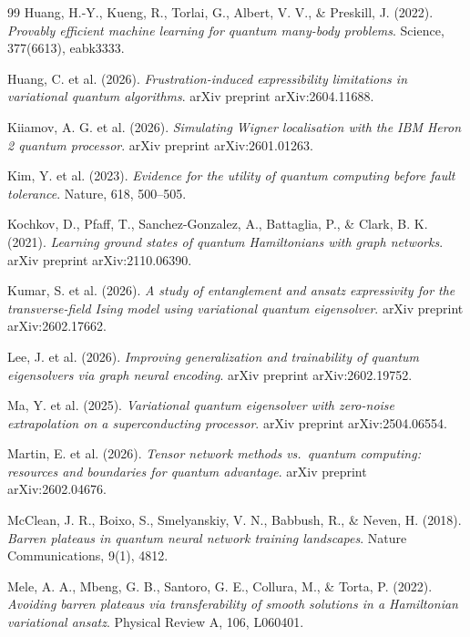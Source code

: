 \documentclass[11pt,a4paper,spanish]{book}
\begin{document}
\begin{thebibliography}{99}
 Huang, H.-Y., Kueng, R., Torlai, G., Albert, V. V., \& Preskill, J. (2022). \emph{Provably efficient machine learning for quantum many-body problems}. Science, 377(6613), eabk3333.

 Huang, C. et al. (2026). \emph{Frustration-induced expressibility limitations in variational quantum algorithms}. arXiv preprint arXiv:2604.11688.

 Kiiamov, A. G. et al. (2026). \emph{Simulating Wigner localisation with the IBM Heron 2 quantum processor}. arXiv preprint arXiv:2601.01263.

 Kim, Y. et al. (2023). \emph{Evidence for the utility of quantum computing before fault tolerance}. Nature, 618, 500--505.

 Kochkov, D., Pfaff, T., Sanchez-Gonzalez, A., Battaglia, P., \& Clark, B. K. (2021). \emph{Learning ground states of quantum Hamiltonians with graph networks}. arXiv preprint arXiv:2110.06390.

 Kumar, S. et al. (2026). \emph{A study of entanglement and ansatz expressivity for the transverse-field Ising model using variational quantum eigensolver}. arXiv preprint arXiv:2602.17662.

 Lee, J. et al. (2026). \emph{Improving generalization and trainability of quantum eigensolvers via graph neural encoding}. arXiv preprint arXiv:2602.19752.

 Ma, Y. et al. (2025). \emph{Variational quantum eigensolver with zero-noise extrapolation on a superconducting processor}. arXiv preprint arXiv:2504.06554.

 Martin, E. et al. (2026). \emph{Tensor network methods vs.\ quantum computing: resources and boundaries for quantum advantage}. arXiv preprint arXiv:2602.04676.

 McClean, J. R., Boixo, S., Smelyanskiy, V. N., Babbush, R., \& Neven, H. (2018). \emph{Barren plateaus in quantum neural network training landscapes}. Nature Communications, 9(1), 4812.

 Mele, A. A., Mbeng, G. B., Santoro, G. E., Collura, M., \& Torta, P. (2022). \emph{Avoiding barren plateaus via transferability of smooth solutions in a Hamiltonian variational ansatz}. Physical Review A, 106, L060401.


\end{thebibliography}
\end{document}
